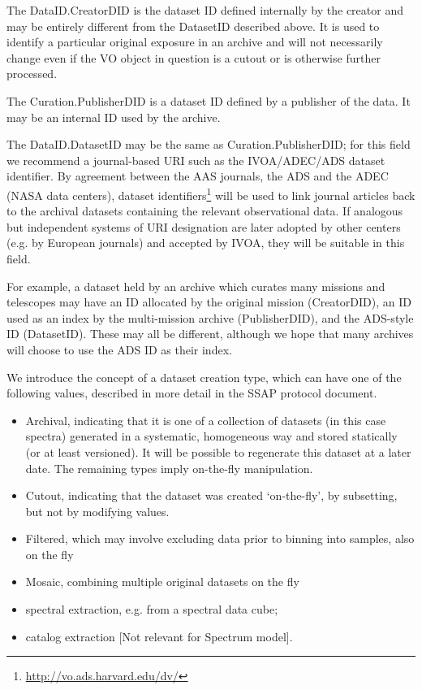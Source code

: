 \documentclass[11pt]{article}
\begin{document}
The DataID.CreatorDID is the dataset ID defined internally by
the creator and may be entirely different from the DatasetID described
above. It is used to identify a particular original exposure in an archive
and will not necessarily change even if the VO object in question is a cutout or
is otherwise further processed.

The Curation.PublisherDID is a dataset ID defined by a publisher
of the data. It may be an internal ID used by the archive.

The DataID.DatasetID may be the same as Curation.PublisherDID;
for this field we recommend a journal-based URI such
as the IVOA/ADEC/ADS dataset identifier.
By agreement between the AAS journals, the ADS and the ADEC (NASA data centers),
dataset identifiers\footnote{\url{http://vo.ads.harvard.edu/dv/}}
will be used to link journal articles back
to the archival datasets containing the relevant observational data.
If analogous but independent systems of URI designation are later
adopted by other centers (e.g. by European journals) and accepted by IVOA,
they will be suitable in this field.

For example, a dataset held by an archive which curates many
missions and telescopes may have an ID allocated by the original
mission (CreatorDID), an ID used as an index by the multi-mission archive (PublisherDID),
and the ADS-style ID (DatasetID). These may all be different, although
we hope that many archives will choose to use the ADS ID as their index.

We introduce the concept of a dataset creation type, which
can have one of the following  values, described in more
detail in the SSAP protocol document.

\begin{itemize}

\item Archival, indicating that it is one of a collection of
datasets (in this case spectra) generated in a systematic, homogeneous
way and stored statically (or at least versioned). It will be possible
to regenerate this dataset at a later date. The remaining types
imply on-the-fly manipulation.

\item Cutout, indicating that the dataset was created `on-the-fly',
by subsetting, but not by modifying values.

\item Filtered,  which may involve excluding data prior
to binning into samples, also on the fly

\item Mosaic, combining multiple original datasets on the fly

\item spectral extraction, e.g. from a spectral data cube;

\item catalog extraction [Not relevant for Spectrum model].

\end{itemize}
\end{document}
